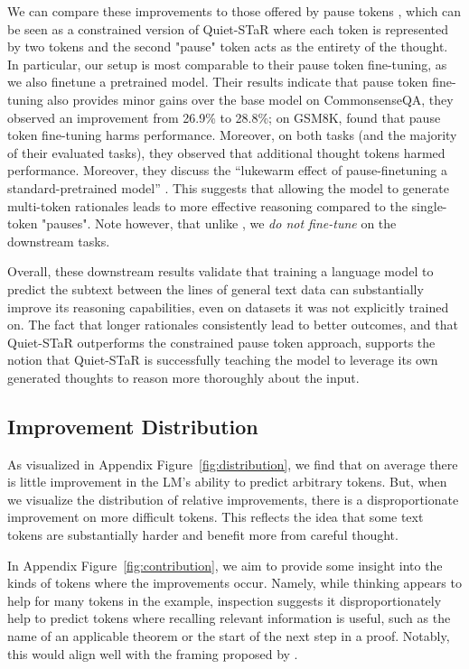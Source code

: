\documentclass{article} %
\begin{document}
We can compare these improvements to those offered by pause tokens \citep{goyal2023think}, which can be seen as a constrained version of Quiet-STaR where each token is represented by two tokens and the second "pause" token acts as the entirety of the thought. In particular, our setup is most comparable to their pause token fine-tuning, as we also finetune a pretrained model. Their results indicate that pause token fine-tuning also provides minor gains over the base model on CommonsenseQA, they observed an improvement from 26.9\% to 28.8\%; on GSM8K, \citet{goyal2023think} found that pause token fine-tuning harms performance. Moreover, on both tasks (and the majority of their evaluated tasks), they observed that additional thought tokens harmed performance. Moreover, they discuss the ``lukewarm effect of pause-finetuning a standard-pretrained model'' \citep{goyal2023think}. This suggests that allowing the model to generate multi-token rationales leads to more effective reasoning compared to the single-token "pauses". Note however, that unlike \citet{goyal2023think}, we \textit{do not fine-tune} on the downstream tasks.

Overall, these downstream results validate that training a language model to predict the subtext between the lines of general text data can substantially improve its reasoning capabilities, even on datasets it was not explicitly trained on. The fact that longer rationales consistently lead to better outcomes, and that Quiet-STaR outperforms the constrained pause token approach, supports the notion that Quiet-STaR is successfully teaching the model to leverage its own generated thoughts to reason more thoroughly about the input.

\vspace{-5px}
\subsection{Improvement Distribution}\vspace{-3px}
As visualized in Appendix Figure~\ref{fig:distribution}, we find that on average there is little improvement in the LM's ability to predict arbitrary tokens. But, when we visualize the distribution of relative improvements, there is a disproportionate improvement on more difficult tokens. This reflects the idea that some text tokens are substantially harder and benefit more from careful thought.

In Appendix Figure~\ref{fig:contribution}, we aim to provide some insight into the kinds of tokens where the improvements occur. Namely, while thinking appears to help for many tokens in the example, inspection suggests it disproportionately help to predict tokens where recalling relevant information is useful, such as the name of an applicable theorem or the start of the next step in a proof. Notably, this would align well with the framing proposed by \citet{prystawski2024think}.
\end{document}
